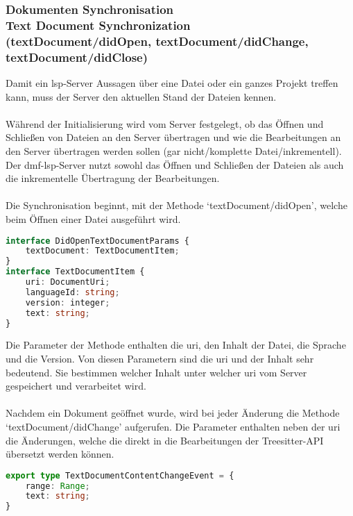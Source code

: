 \documentclass[./einleitung.tex]{subfiles}
\begin{document}
    \subsubsection[Dokumenten Synchronisation]{Dokumenten Synchronisation\\ {\textnormal{\footnotesize Text Document Synchronization \\ (textDocument/didOpen, textDocument/didChange, textDocument/didClose) \cite{dokumente}}}}\label{subsubsec:dokumenten-synchronisation}
    Damit ein \acrshort{lsp}-Server Aussagen über eine Datei oder ein ganzes Projekt treffen kann, muss der Server den aktuellen Stand der Dateien kennen.
    \\\\
    Während der Initialisierung wird vom Server festgelegt, ob das Öffnen und Schließen von Dateien an den Server übertragen und wie die Bearbeitungen an den Server übertragen werden sollen (gar nicht/komplette Datei/inkrementell).
    Der \acrshort{dmf}-\acrshort{lsp}-Server nutzt sowohl das Öffnen und Schließen der Dateien als auch die inkrementelle Übertragung der Bearbeitungen.
    \\\\
    Die Synchronisation beginnt, mit der Methode `textDocument/didOpen', welche beim Öffnen einer Datei ausgeführt wird.
    \begin{lstlisting}[language=Typescript,title=Definition der Parameter \cite{dokumente}, label=lst:dokumenteParams]
interface DidOpenTextDocumentParams {
	textDocument: TextDocumentItem;
}
interface TextDocumentItem {
	uri: DocumentUri;
	languageId: string;
	version: integer;
	text: string;
}
    \end{lstlisting}
    Die Parameter der Methode enthalten die \acrfull{uri}, den Inhalt der Datei, die Sprache und die Version.
    Von diesen Parametern sind die \acrshort{uri} und der Inhalt sehr bedeutend.
    Sie bestimmen welcher Inhalt unter welcher \acrshort{uri} vom Server gespeichert und verarbeitet wird.
    \\\\
    Nachdem ein Dokument geöffnet wurde, wird bei jeder Änderung die Methode `textDocument/didChange' aufgerufen.
    Die Parameter enthalten neben der \acrshort{uri} die Änderungen, welche die direkt in die Bearbeitungen der Treesitter-API übersetzt werden können.
    \begin{lstlisting}[language=Typescript, title=Definition der Bearbeitungen (ohne irrelevante Elemente)\cite{dokumente}, label=lst:dokumenteBearbeitung]
export type TextDocumentContentChangeEvent = {
	range: Range;
	text: string;
}
    \end{lstlisting}
\end{document}
